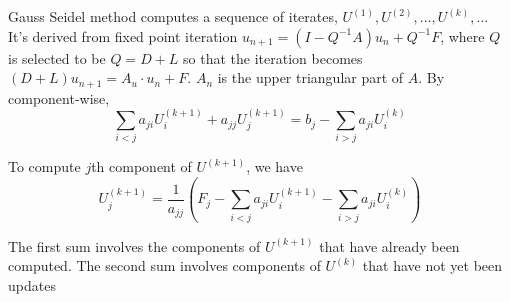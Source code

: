 	Gauss Seidel method computes a sequence of iterates, $U^{(1)}, U^{(2)}, ..., U^{(k)}, ...$ It's derived from fixed point iteration $u_{n + 1} = (I - Q^{-1}A)u_{n} + Q^{-1}F$, where $Q$ is selected to be $Q = D + L$ so that the iteration becomes $(D+L)u_{n + 1} = A_u\cdot u_n + F$. $A_n$ is the upper triangular part of $A$. By component-wise, $$\sum_{i < j}a_{ji}U_i^{(k + 1)} + a_{jj}U_j^{(k + 1)} = b_j - \sum_{i >j}a_{ji}U_i^{(k)}$$
	
	To compute $j$th component of $U^{(k + 1)}$, we have 
	\begin{equation}
		U_{j}^{(k + 1)} = \frac{1}{a_{jj}}(F_j - \sum_{i < j}a_{ji}U_i^{(k + 1)} - \sum_{i > j}a_{ji}U_i^{(k)})
	\end{equation}
	
	The first sum involves the components of $U^{(k + 1)}$ that have already been computed. The second sum involves components of $U^{(k)}$ that have not yet been updates

	



